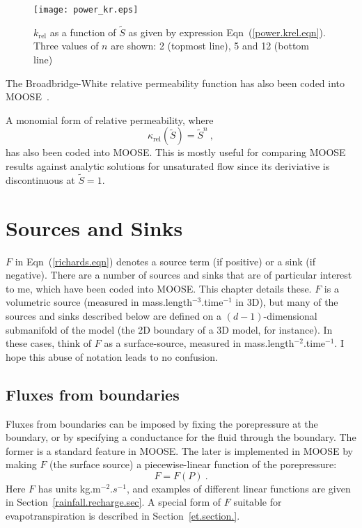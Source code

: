 \documentclass[]{scrreprt}
\begin{document}
\begin{figure}[htb]
\centering
\texttt{[image: power\_kr.eps]}
\caption{$k_{\mathrm{rel}}$ as a function of $\tilde{S}$
  as given by expression Eqn~(\ref{power.krel.eqn}).
Three values  of $n$ are shown: 2 (topmost line), 5 and 12 (bottom line)}
\label{power_krel.fig}
\end{figure}


The Broadbridge-White relative permeability function has also been
coded into MOOSE~\cite{bw1988}.

A monomial form of relative permeability, where
\begin{equation}
\kappa_{\mathrm{rel}}(\tilde{S}) = \tilde{S}^{n} \ ,
\label{monomial.krel.eqn}
\end{equation}
has also been coded into MOOSE.  This is mostly useful for comparing
MOOSE results against analytic solutions for unsaturated flow since
its deriviative is discontinuous at $\tilde{S}=1$.




\chapter{Sources and Sinks}
\label{sources.sinks.chap}

$F$ in Eqn~(\ref{richards.eqn}) denotes a source term (if positive) or
a sink (if negative).  There are a number of sources and sinks that
are of particular interest to me, which have been coded
into MOOSE.  This chapter details these.  $F$ is a volumetric source
(measured in mass.length$^{-3}$.time$^{-1}$ in 3D), but many of the sources
and sinks described below are defined on a $(d-1)$-dimensional
submanifold of the model (the 2D boundary of a 3D model, for
instance).  In these cases, think of $F$ as a surface-source, measured
in mass.length$^{-2}$.time$^{-1}$.  I hope this abuse of notation
leads to no confusion.

\section{Fluxes from boundaries}
\label{fluxes.from.bdy.sec}

Fluxes from boundaries can be imposed by fixing the porepressure at
the boundary, or by specifying a conductance for the fluid through the
boundary.  The former is a standard feature in MOOSE.  The later is
implemented in MOOSE by making $F$ (the surface source) a
piecewise-linear function of the porepressure:
\begin{equation}
F = F(P) \ .
\label{piecewise.lineear.flux.bdy}
\end{equation}
Here $F$ has units kg.m$^{-2}.s^{-1}$, and examples of different
linear functions are given in Section~\ref{rainfall.recharge.sec}.  A
special form of $F$ suitable for evapotranspiration is described in
Section~\ref{et.section.}.
\end{document}
